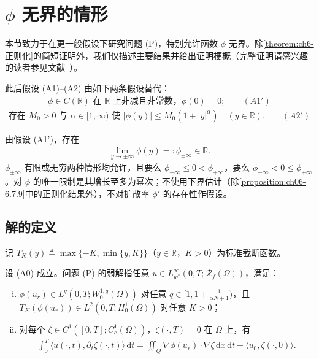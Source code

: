 \documentclass[../../main.tex]{subfiles}%
\begin{document}
\section{$\phi$ 无界的情形}\label{section:ch06-无界phi}

本节致力于在更一般假设下研究问题 (P)，特别允许函数 $\phi$ 无界。除\cref{theorem:ch6-正则化}的简短证明外，我们仅描述主要结果并给出证明梗概（完整证明请感兴趣的读者参见文献~\cite{ref87}）。

此后假设 (A1)--(A2) 由如下两条假设替代：
\begin{align*}
\phi\in C(\mathbb{R}) \text{ 在 }\mathbb{R}\text{ 上非减且非常数，}\phi(0)=0; \qquad(A1')
\end{align*}
\begin{align}
\text{存在 }M_0>0\text{ 与 }\alpha\in[1,\infty)\text{ 使 }|\phi(y)|\leqslant M_0(1+|y|^\alpha)
\quad(y\in\mathbb{R}). \qquad(A2') \label{align:ch6-A2p}
\end{align}

由假设 (A1')，存在
\begin{align}
\lim_{y\to\pm\infty}\phi(y)=:\phi_{\pm\infty}\in\mathbb{R}. \label{align:ch6-6.131}
\end{align}
$\phi_{\pm\infty}$ 有限或无穷两种情形均允许，且要么 $\phi_{-\infty}\leqslant0<\phi_{+\infty}$，要么 $\phi_{-\infty}<0\leqslant\phi_{+\infty}$。对 $\phi$ 的唯一限制是其增长至多为幂次；不使用下界估计（除\cref{proposition:ch06-6.7.9}中的正则化结果外），不对扩散率 $\phi'$ 的存在性作假设。

\subsection{解的定义}\label{subsection:ch06-无界解定义}

记 $T_K(y)\triangleq \max\{-K,\min\{y,K\}\}$（$y\in\mathbb{R}$，$K>0$）为标准截断函数。

\begin{definition}\label{definition:ch06-无界弱解}
设 (A0) 成立。问题 (P) 的弱解指任意 $u\in L^\infty_{w^*}(0,T;\mathscr{R}_f(\Omega))$，满足：
\begin{enumerate}[(i)]
\item $\phi(u_r)\in L^q(0,T;W^{1,q}_0(\Omega))$ 对任意 $q\in[1,1+\frac{1}{\alpha N+1})$，且 $T_K(\phi(u_r))\in L^2(0,T;H^1_0(\Omega))$ 对任意 $K>0$；
\item 对每个 $\zeta\in C^1([0,T];C^1_c(\Omega))$，$\zeta(\cdot,T)=0$ 在 $\Omega$ 上，有
\begin{align}
\int_0^T\langle u(\cdot,t),\partial_t\zeta(\cdot,t)\rangle\,\mathrm{d}t
= \iint_Q\nabla\phi(u_r)\cdot\nabla\zeta\,\mathrm{d}x\,\mathrm{d}t
-\langle u_0,\zeta(\cdot,0)\rangle. \label{align:ch6-6.132}
\end{align}
\end{enumerate}
\end{definition}
\end{document}
